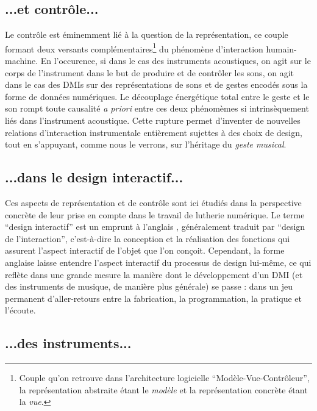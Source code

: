 \subsection*{...et contrôle...}

\noindent Le contrôle est éminemment lié à la question de la représentation, ce couple formant deux versants complémentaires\footnote{Couple qu'on retrouve dans l'architecture logicielle ``Modèle-Vue-Contrôleur'', la représentation abstraite étant le \textit{modèle} et la représentation concrète étant la \textit{vue}.} du phénomène d'interaction humain-machine. En l'occurence, si dans le cas des instruments acoustiques, on agit sur le corps de l'instrument dans le but de produire et de contrôler les sons, on agit dans le cas des \glspl{DMI} sur des représentations de sons et de gestes encodés sous la forme de données numériques. Le découplage énergétique total entre le geste et le son rompt toute causalité \textit{a priori} entre ces deux phénomèmes si intrinsèquement liés dans l'instrument acoustique. Cette rupture permet d'inventer de nouvelles relations d'interaction instrumentale entièrement sujettes à des choix de design, tout en s'appuyant, comme nous le verrons, sur l'héritage du \textit{geste musical}.


\subsection*{...dans le design interactif...}

\noindent Ces aspects de représentation et de contrôle sont ici étudiés dans la perspective concrète de leur prise en compte dans le travail de lutherie numérique. Le terme ``design interactif'' est un emprunt à l'anglais , généralement traduit par ``design de l'interaction'', c'est-à-dire la conception et la réalisation des fonctions qui assurent l'aspect interactif de l'objet que l'on conçoit. Cependant, la forme anglaise laisse entendre l'aspect interactif du processus de design lui-même, ce qui reflète dans une grande mesure la manière dont le développement d'un \gls{DMI} (et des instruments de musique, de manière plus générale) se passe : dans un jeu permanent d'aller-retours entre la fabrication, la programmation, la pratique et l'écoute.

\subsection*{...des instruments...}

